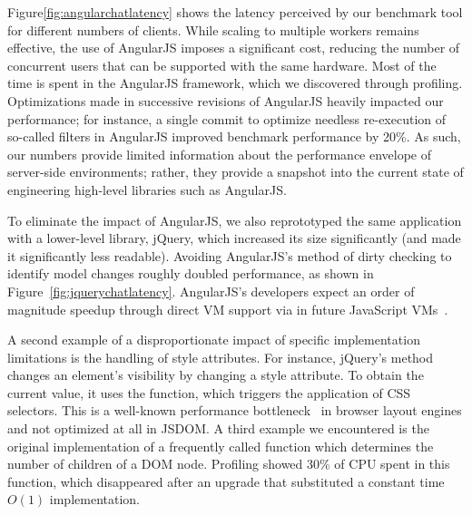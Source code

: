 Figure\ref{fig:angularchatlatency} shows the latency perceived by our benchmark tool
for different numbers of clients.  While scaling to multiple workers remains effective,
the use of AngularJS imposes a significant cost, reducing the number of concurrent users 
that can be supported with the same hardware.  Most of the time is spent in the AngularJS
framework, which we discovered through profiling.  Optimizations made in successive revisions
of AngularJS heavily impacted our performance; for instance, a single commit to optimize
needless re-execution of so-called filters in AngularJS improved benchmark performance by 20\%.
As such, our numbers provide limited information about the performance envelope of
server-side environments; rather, they provide a snapshot into the current state of
engineering high-level libraries such as AngularJS.  

\jquerychatlatency{}
To eliminate the impact of AngularJS, we also reprototyped the same application with a
lower-level library, jQuery, which increased its size significantly (and made it significantly
less readable).  Avoiding AngularJS's method of dirty checking to identify model changes
roughly doubled performance, as shown in Figure~\ref{fig:jquerychatlatency}.
AngularJS's developers expect an order of magnitude speedup through direct VM 
support via  in future JavaScript VMs~\cite{angularjsspeedup}.

A second example of a disproportionate impact of specific implementation limitations
is the handling of style attributes.  For instance, jQuery's  method changes an element's
visibility by changing a style attribute.  To obtain the current value, it uses the
 function, which triggers the application of CSS selectors.
This is a well-known performance bottleneck~\cite{Meyerovich+:WWW2010} in browser
layout engines and not optimized at all in JSDOM.  A third example we encountered 
is the original implementation of a frequently called function 
which determines the number of children of a DOM node.  Profiling showed 30\% of CPU
spent in this function, which disappeared after an upgrade that substituted a
constant time $O(1)$ implementation.
